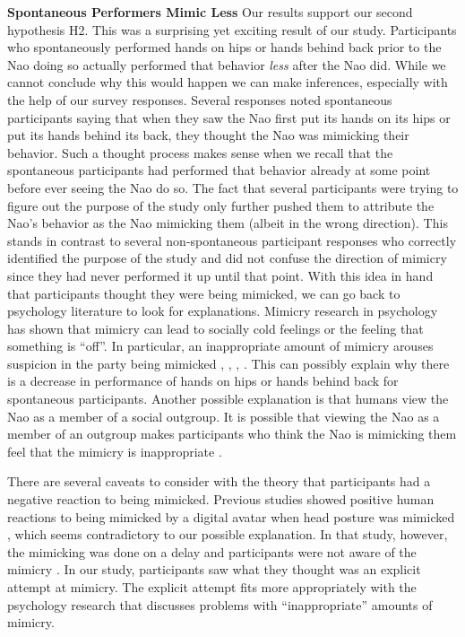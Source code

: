 \documentclass{acm_proc_article-sp}
\begin{document}
\textbf{Spontaneous Performers Mimic Less} Our results support our second hypothesis H2. This was a surprising yet exciting result of our study. Participants who spontaneously performed hands on hips or hands behind back prior to the Nao doing so actually performed that behavior \textit{less} after the Nao did. While we cannot conclude why this would happen we can make inferences, especially with the help of our survey responses. Several responses noted spontaneous participants saying that when they saw the Nao first put its hands on its hips or put its hands behind its back, they thought the Nao was mimicking their behavior. Such a thought process makes sense when we recall that the spontaneous participants had performed that behavior already at some point before ever seeing the Nao do so. The fact that several participants were trying to figure out the purpose of the study only further pushed them to attribute the Nao's behavior as the Nao mimicking them (albeit in the wrong direction). This stands in contrast to several non-spontaneous participant responses who correctly identified the purpose of the study and did not confuse the direction of mimicry since they had never performed it up until that point. With this idea in hand that participants thought they were being mimicked, we can go back to psychology literature to look for explanations. Mimicry research in psychology has shown that mimicry can lead to socially cold feelings or the feeling that something is ``off''. In particular, an inappropriate amount of mimicry arouses suspicion in the party being mimicked \cite{bargh2012substitutability}, \cite{leander2012you}, \cite{stel2010mimicking}, \cite{zhong2008cold}. This can possibly explain why there is a decrease in performance of hands on hips or hands behind back for spontaneous participants. Another possible explanation is that humans view the Nao as a member of a social outgroup. It is possible that viewing the Nao as a member of an outgroup makes participants who think the Nao is mimicking them feel that the mimicry is inappropriate \cite{kavanagh2011s}.%

There are several caveats to consider with the theory that participants had a negative reaction to being mimicked. Previous studies showed positive human reactions to being mimicked by a digital avatar when head posture was mimicked \cite{bailenson2005digital}, which seems contradictory to our possible explanation. In that study, however, the mimicking was done on a delay and participants were not aware of the mimicry \cite{bailenson2005digital}. In our study, participants saw what they thought was an explicit attempt at mimicry. The explicit attempt fits more appropriately with the psychology research that discusses problems with ``inappropriate'' amounts of mimicry.
\end{document}
